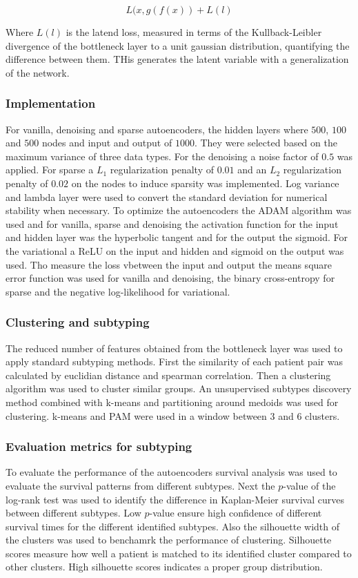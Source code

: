 			$$L(x, g(f(x))+L(l)$$

			Where $L(l)$ is the latend loss, measured in terms of the Kullback-Leibler divergence of the bottleneck layer to a unit gaussian distribution, quantifying the difference between them.
			THis generates the latent variable with a generalization of the network.

		\subsubsection{Implementation}
		For vanilla, denoising and sparse autoencoders, the hidden layers where $500$, $100$ and $500$ nodes and input and output of $1000$.
		They were selected based on the maximum variance of three data types.
		For the denoising a noise factor of $0.5$ was applied.
		For sparse a $L_1$ regularization penalty of $0.01$ and an $L_2$ regularization penalty of $0.02$ on the nodes to induce sparsity was implemented.
		Log variance and lambda layer were used to convert the standard deviation for numerical stability when necessary.
		To optimize the autoencoders the ADAM algorithm was used and for vanilla, sparse and denoising the activation function for the input and hidden layer was the hyperbolic tangent and for the output the sigmoid.
		For the variational a ReLU on the input and hidden and sigmoid on the output was used.
		Tho measure the loss vbetween the input and output the means square error function was used for vanilla and denoising, the binary cross-entropy for sparse and the negative log-likelihood for variational.

		\subsubsection{Clustering and subtyping}
		The reduced number of features obtained from the bottleneck layer was used to apply standard subtyping methods.
		First the similarity of each patient pair was calculated by euclidian distance and spearman correlation.
		Then a clustering algorithm was used to cluster similar groups.
		An unsupervised subtypes discovery method combined with k-means and partitioning around medoids was used for clustering.
		k-means and PAM were used in a window between $3$ and $6$ clusters.

		\subsubsection{Evaluation metrics for subtyping}
		To evaluate the performance of the autoencoders survival analysis was used to evaluate the survival patterns from different subtypes.
		Next the $p$-value of the log-rank test was used to identify the difference in Kaplan-Meier survival curves between different subtypes.
		Low $p$-value ensure high confidence of different survival times for the different identified subtypes.
		Also the silhouette width of the clusters was used to benchamrk the performance of clustering.
		Silhouette scores measure how well a patient is matched to its identified cluster compared to other clusters.
		High silhouette scores indicates a proper group distribution.

